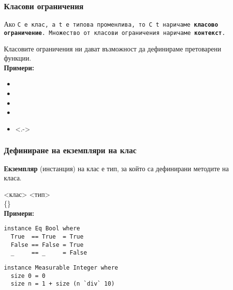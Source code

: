\documentclass[alsotrans]{beamerswitch}
\begin{document}
\begin{frame}
  \frametitle{Класови ограничения}
  \begin{definition}
    Ако \tt{C} e клас, а \tt{t} е типова променлива, то \tt{C t} наричаме \textbf{класово ограничение}. \pause Множество от класови ограничения наричаме \textbf{контекст}.
  \end{definition}
  \pause
  Класовите ограничения ни дават възможност да дефинираме претоварени функции.\\[2ex]
  \pause
  \textbf{Примери:}
  \begin{itemize}[<+->]
  \item {}
  \item {}
  \item {}
  \item {}
  \item<.-> 
  \end{itemize}
\end{frame}

\begin{frame}[fragile]
  \frametitle{Дефиниране на екземпляри на клас}
  \begin{definition}
    \textbf{Екземпляр} (инстанция) на клас е тип, за който са дефинирани методите на класа.
  \end{definition}
  \pause
   <клас> <тип> \\
  \hspace{1em} \{<дефиниция-на-метод>\}\\[1ex]
  \pause
  \textbf{Примери:}%
  \vspace{-1ex}
\begin{lstlisting}
instance Eq Bool where
  True  == True  = True
  False == False = True
  _     == _     = False
\end{lstlisting}\pause%
\begin{lstlisting}
instance Measurable Integer where
  size 0 = 0
  size n = 1 + size (n `div` 10)
\end{lstlisting}
\end{frame}
\end{document}
